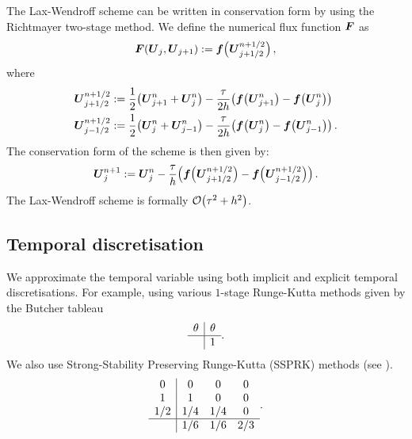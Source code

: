 \documentclass[final]{amsart}
\renewcommand{\vec}[1]{\geovec{#1}}
\numberwithin{equation}{section}
\begin{document}
\begin{Rem}
  The Lax-Wendroff scheme can be written in conservation form by
        using the Richtmayer two-stage method.  We define the numerical
        flux function $\vec F$ as
	\begin{equation}\label{eq_F_LxW_cons}
	\vec F\qp{\vec U_j,\vec U_{j+1}}:= \vec f\qp{\vec U^{n+1/2}_{j+1/2}},
	\end{equation}
	where 
	\begin{equation}
	\begin{split}
	\vec U^{n+1/2}_{j+1/2}&:=\frac{1}{2}\qp{\vec U^n_{j+1} + \vec U^n_{j}}-\frac{\tau}{2h}\qp{\vec f\qp{\vec U^n_{j+1}}-\vec f\qp{\vec U^n_j}}\\
	\vec U^{n+1/2}_{j-1/2}&:=\frac{1}{2}\qp{\vec U^n_{j} + \vec U^n_{j-1}}-\frac{\tau}{2h}\qp{\vec f\qp{\vec U^n_{j}}-\vec f\qp{\vec U^n_{j-1}}}.
	\end{split}
	\end{equation}
	The conservation form of the scheme is then given by:
	\begin{equation}\label{eq_LxW_scheme}
	\vec U^{n+1}_j:= \vec  U^n_j-\frac{\tau}{h}\qp{\vec f\qp{\vec U^{n+1/2}_{j+1/2}}-\vec f\qp{\vec U^{n+1/2}_{j-1/2}}}.
	\end{equation}
	The Lax-Wendroff scheme is formally $\mathcal{O}\!\left({\tau^2 +h^2}\right)$.
\end{Rem}


\subsection{Temporal discretisation}
We approximate the temporal variable using both implicit and explicit
temporal discretisations.  For example, using various $1$-stage Runge-Kutta methods given by the Butcher tableau
\begin{equation}
  \begin{array}
    {c|c}
    \theta & \theta
    \\
    \hline
    & 1 
  \end{array}.
\end{equation}
We also use  Strong-Stability Preserving
Runge-Kutta (SSPRK) methods (see \cite{gottlieb2001strong}).
\begin{equation}
  \begin{array}{c|ccc}0&0&0&0\\1&1&0&0\\1/2&1/4&1/4&0\\\hline &1/6&1/6&2/3\\\end{array}.
\end{equation}
\end{document}
